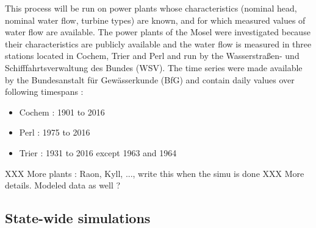 This process will be run on power plants whose characteristics (nominal head, nominal water flow, turbine types) are known, and for which measured values of water flow are available. \newline
The power plants of the Mosel were investigated because their characteristics are publicly available \cite{mosel} and the water flow is measured in three stations located in Cochem, Trier and Perl and run by the Wasserstraßen- und Schifffahrtsverwaltung des Bundes (WSV). The time series were made available by the Bundesanstalt für Gewässerkunde (BfG) and contain daily values over following timespans :
\begin{itemize}
 \item Cochem \tabto{2cm}: 1901 to 2016
 \item Perl \tabto{2cm}: 1975 to 2016
 \item Trier \tabto{2cm}: 1931 to 2016 except 1963 and 1964
\end{itemize}
XXX More plants : Raon, Kyll, ..., write this when the simu is done
XXX More details. Modeled data as well ?

\subsection{State-wide simulations} 

